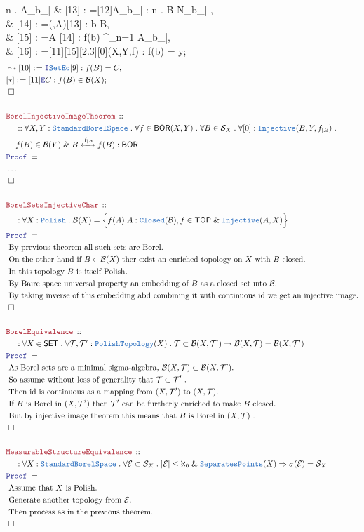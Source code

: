 \documentclass[12pt]{scrartcl}
\newcommand{\TYPE}[1]{\textcolor{NavyBlue}{\mathtt{#1}}}
\newcommand{\LOGIC}[1]{\textcolor{Blue}{\mathtt{#1}}}
\newcommand{\THM}[1]{\textcolor{Maroon}{\mathtt{#1}}}
\renewcommand{\.}{\; . \;}
\newcommand{\de}{: \kern 0.1pc =}
\newcommand{\Theorem}[2]{& \THM{#1} \, :: \, #2 \\ & \Proof = \\ }
\newcommand{\NewLine}{\\ & \kern 1pc}
\newcommand{\Page}[1]{ \begin{align*} #1 \end{align*}   }
\newcommand{\NoProof}{ & \ldots \\ \EndProof}
\renewcommand{\And}{\; \& \;}
\newcommand{\Imply}{\Rightarrow}
\newcommand{\Intro}{\LOGIC{I}}
\newcommand{\Elim}{\LOGIC{E}}
\newcommand{\Nat}{\mathbb{N} }
\DeclareMathOperator*{\id}{id}
\newcommand{\ToIso}{\xleftrightarrow}
\newcommand{\Say}[3]{& #1 \de #2 : #3, \\}
\newcommand{\Conclude}[3]{& #1 \de #2 : #3; \\}
\newcommand{\Derive}[3]{& \leadsto #1 \de #2 : #3, \\}
\newcommand{\QED}{\; \square}
\newcommand{\EndProof}{& \QED \\}
\newcommand{\Proof}{\LOGIC{Proof} \; }
\newcommand{\Explain}[1]{& \text{#1.} \\}
\newcommand{\Inj}{\TYPE{Injective}}
\newcommand{\B}{\mathcal{B}}
\newcommand{\SET}{\mathsf{SET}}
\newcommand{\Closed}{\TYPE{Closed}}
\newcommand{\TOP}{\mathsf{TOP}}
\newcommand{\T}{\mathcal{T}}
\newcommand{\Polish}{\TYPE{Polish}}
\newcommand{\SBS}{\TYPE{StandardBorelSpace}}
\newcommand{\inits}[2]{{#1}_{|\left[1,\ldots,#2\right]}}
\newcommand{\BOR}{\mathsf{BOR}}
\renewcommand{\S}{\mathcal{S}}
\begin{document}
{	{
		\forall n \in \Nat \. \exists A_{\inits{b}{n}}
	}
	\Say{[13]}{[12]\Elim A_{\inits{b}{n}}}{
		\forall n \in \Nat \.  \exists B \cap N_{\inits{b}{n}}
	}
	\Say{[14]}{\Elim \Closed(\B,A)[13]}{b \in B}
	\Say{[15]}{\Intro A [14]}{f(b) \in \bigcap^\infty_{n=1} A_{\inits{b}{n}}}
	\Conclude{[16]}{[11][15][2.3][0]\Elim \TOP(X,Y,f)}{f(b) = y}
}\Page{
	\Derive{[10]}{\Intro \TYPE{SetEq}[9]}{f(B) = C}
	\Conclude{[*]}{[11]\Elim C}{f(B) \in \B(X)}
	\EndProof
	\\
	\Theorem{BorelInjectiveImageTheorem}
	{
		\NewLine ::
		\forall X,Y : \SBS \.
		\forall f \in \BOR(X,Y) \.
		\forall B \in \S_X \.
		\forall [0] : \Inj(B,Y,f_{|B}) \. \NewLine
		f(B) \in \B(Y) \And B \ToIso{f_{|B}} f(B) : \BOR
	}
	\NoProof
	\\
	\Theorem{BorelSetsInjectiveChar}
	{
		\NewLine :		
		\forall X : \Polish \.
		\B(X) = \Big\{ f(A) | A : \Closed(\B), f \in \TOP \And \Inj(A,X)  \Big\}
	}
	\Explain{ By previous theorem all such sets are Borel}	
	\Explain{ On the other hand if $B \in \B(X)$ ther exist an enriched topology on $X$ with $B$ closed}
	\Explain{ In this topology $B$ is itself Polish}
	\Explain{ By Baire space universal property an embedding of $B$ as a closed set into $\B$}
	\Explain{ By taking inverse of this embedding abd combining 
		it with continuous $\id$ we get an injective image}
	\EndProof
	\\
	\Theorem{BorelEquivalence}
	{
		\NewLine :		
		\forall X \in \SET \.
		\forall \T,\T' : \TYPE{PolishTopology}(X) \.
		\T \subset \B(X,\T')
		\Imply
		\B(X,\T) = \B(X,\T')
	}
	\Explain{
		As Borel sets are a minimal sigma-algebra,
		$\B(X,\T) \subset \B(X,\T') $}
	\Explain{ So assume without loss of generality that $\T \subset \T'$ }
	\Explain{ Then $\id$ is continuous as a mapping from $(X,\T')$ to $(X,\T)$}
	\Explain{ If $B$ is Borel in $(X,\T')$ then $\T'$ can be furtherly enriched to make $B$ closed}
	\Explain{ But by injective image theorem this means that $B$ is Borel in $(X,\T)$ }
	\EndProof
	\\
	\Theorem{MeasurableStructureEquivalence}
	{
		\NewLine :		
		\forall X : \SBS \.
		\forall \mathcal{E} \subset \S_X \.
		|\mathcal{E}| \le \aleph_0 \And \TYPE{SeparatesPoints}(X)
		\Imply
		\sigma(\mathcal{E}) = \S_X
	}
	\Explain{ Assume that $X$ is Polish}
	\Explain{ Generate another topology from $\mathcal{E}$}
	\Explain{ Then process as in the previous theorem}
	\EndProof
}
\newpage
\end{document}
